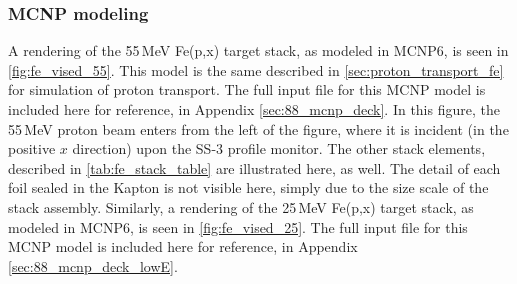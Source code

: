 \subsubsection{MCNP modeling}



% 
% 
%
A rendering of the 55\,MeV Fe(p,x) target stack, as modeled in MCNP6, is seen in \autoref{fig:fe_vised_55}.
This model is the same described in \autoref{sec:proton_transport_fe} for simulation of proton transport.
The full input file for this MCNP model is included here for reference, in Appendix \ref{sec:88_mcnp_deck}.
In this figure, the 55\,MeV proton beam enters from the left of the figure, where it is incident (in the positive $x$ direction) upon the SS-3 profile monitor.
The other stack elements, described in  \autoref{tab:fe_stack_table} are illustrated here, as well.
% 
% 
The detail of each foil sealed in the Kapton is not visible here, simply due to the size scale of the stack assembly.
Similarly, a rendering of the 25\,MeV Fe(p,x) target stack, as modeled in MCNP6, is seen in \autoref{fig:fe_vised_25}.
The full input file for this MCNP model is included here for reference, in Appendix \ref{sec:88_mcnp_deck_lowE}.




% 
% 
%

